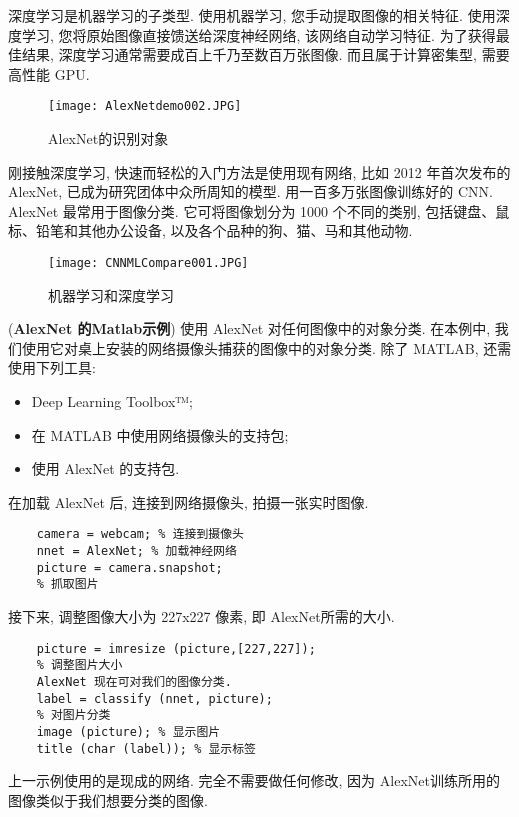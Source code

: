 深度学习是机器学习的子类型. 使用机器学习, 您手动提取图像的相关特征. 使用深度学习, 您将原始图像直接馈送给深度神经网络, 该网络自动学习特征.
为了获得最佳结果, 深度学习通常需要成百上千乃至数百万张图像. 而且属于计算密集型, 需要高性能 GPU.
\begin{figure}[H]
\centering
\texttt{[image: AlexNetdemo002.JPG]}
\caption{AlexNet的识别对象}
\label{AlexNetdemo002}
\vspace{-0.4cm}
\end{figure}
刚接触深度学习, 快速而轻松的入门方法是使用现有网络, 比如 2012 年首次发布的AlexNet, 已成为研究团体中众所周知的模型.
用一百多万张图像训练好的 CNN.
AlexNet 最常用于图像分类. 它可将图像划分为 1000 个不同的类别, 包括键盘、鼠标、铅笔和其他办公设备, 以及各个品种的狗、猫、马和其他动物.
\begin{figure}[H]
    \centering
    \texttt{[image: CNNMLCompare001.JPG]}
    \caption{机器学习和深度学习}
    \label{CNNMLCompare001}
    \vspace{-0.4cm}
\end{figure}
\begin{example}
 (\textbf{AlexNet 的Matlab示例}) 使用 AlexNet 对任何图像中的对象分类. 在本例中, 我们使用它对桌上安装的网络摄像头捕获的图像中的对象分类.
 除了 MATLAB, 还需使用下列工具:
\begin{itemize}
\item Deep Learning Toolbox™;
\item 在 MATLAB 中使用网络摄像头的支持包;
\item 使用 AlexNet 的支持包.
\end{itemize}
在加载 AlexNet 后, 连接到网络摄像头,  拍摄一张实时图像.
\begin{Verbatim}
    camera = webcam; % 连接到摄像头
    nnet = AlexNet; % 加载神经网络
    picture = camera.snapshot;
    % 抓取图片
\end{Verbatim}
接下来, 调整图像大小为 227x227 像素, 即 AlexNet所需的大小.
\begin{Verbatim}
    picture = imresize (picture,[227,227]);
    % 调整图片大小
    AlexNet 现在可对我们的图像分类.
    label = classify (nnet, picture);
    % 对图片分类
    image (picture); % 显示图片
    title (char (label)); % 显示标签
\end{Verbatim}
\end{example}
上一示例使用的是现成的网络. 完全不需要做任何修改, 因为 AlexNet训练所用的图像类似于我们想要分类的图像.

